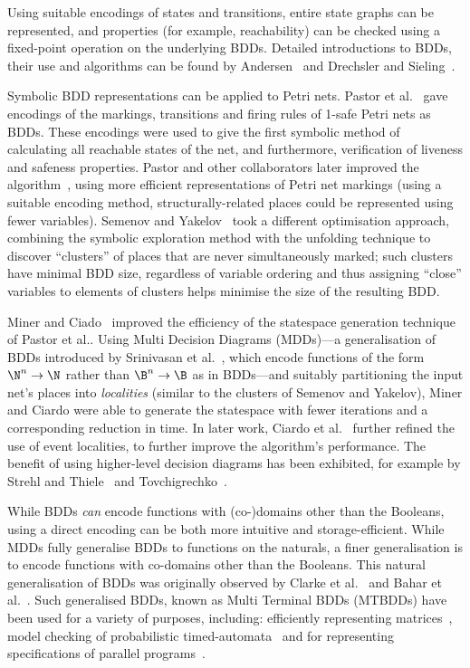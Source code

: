 Using suitable encodings of states and transitions, entire state graphs can be
represented, and properties (for example, reachability) can be checked using a
fixed-point operation on the underlying BDDs. Detailed introductions to BDDs,
their use and algorithms can be found by Andersen~\cite{Andersen1997} and
{Drechsler and Sieling}~\cite{Drechsler2001}.

Symbolic BDD representations can be applied to Petri nets.  {Pastor et
al.}~\cite{Pastor1994} gave encodings of the markings, transitions and firing
rules of 1-safe Petri nets as BDDs. These encodings were used to give the first
symbolic method of calculating all reachable states of the net, and
furthermore, verification of liveness and safeness properties.  Pastor and
other collaborators later improved the algorithm~\cite{Pastor1998, Pastor1999},
using more efficient representations of Petri net markings (using a suitable
encoding method, structurally-related places could be represented using fewer
variables).  {Semenov and Yakelov}~\cite{Semenov1995} took a different
optimisation approach, combining the symbolic exploration method with the
unfolding technique to discover ``clusters'' of places that are never
simultaneously marked; such clusters have minimal BDD size, regardless of
variable ordering and thus assigning ``close'' variables to elements of
clusters helps minimise the size of the resulting BDD.

{Miner and Ciado}~\cite{Miner1999} improved the efficiency of the statespace
generation technique of {Pastor et al.}. Using Multi Decision Diagrams
(MDDs)---a generalisation of BDDs introduced by {Srinivasan et
al.}~\cite{Srinivasan1990}, which encode functions of the form $\N^n \to \N$
rather than $\B^n \to \B$ as in BDDs---and suitably partitioning the input
net's places into \emph{localities} (similar to the clusters of {Semenov and
Yakelov}), Miner and Ciardo were able to generate the statespace with fewer
iterations and a corresponding reduction in time. In later work, {Ciardo et
al.}~\cite{Ciardo1999} further refined the use of event localities, to further
improve the algorithm's performance. The benefit of using higher-level decision
diagrams has been exhibited, for example by {Strehl and
Thiele}~\cite{Strehl1999} and Tovchigrechko~\cite{Tovchigrechko2008}.

While BDDs \emph{can} encode functions with (co-)domains other than the
Booleans, using a direct encoding can be both more intuitive and storage-efficient.
While MDDs fully generalise BDDs to functions on the naturals, a finer
generalisation is to encode functions with co-domains other than the Booleans.
This natural generalisation of BDDs was originally observed by Clarke et
al.~\cite{Clarke1993} and {Bahar et al.}~\cite{Bahar1993}. Such generalised
BDDs, known as Multi Terminal BDDs (MTBDDs) have been used for a variety of
purposes, including: efficiently representing matrices~\cite{Fujita1997}, model
checking of probabilistic timed-automata~\cite{Wang2005} and for representing
specifications of parallel programs~\cite{Ciesinski2008}.

